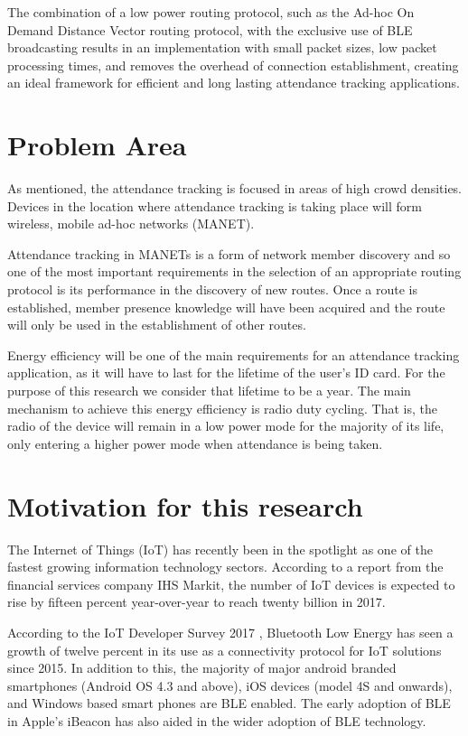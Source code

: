 	The combination of a low power routing protocol, such as the Ad-hoc On Demand
	Distance Vector routing protocol, with the exclusive use of BLE broadcasting results
	in an implementation with small packet sizes, low packet processing times, and
	removes the overhead of connection establishment, creating an ideal framework
	for efficient and long lasting attendance tracking applications.

	\section{Problem Area}
	As mentioned, the attendance tracking is focused in areas of high crowd densities.
	Devices in the location where attendance tracking is taking place will form wireless,
	mobile ad-hoc networks (MANET).

	Attendance tracking in MANETs is a form of network member discovery and so one of
	the most important requirements in the selection of an appropriate routing protocol
	is its performance in the discovery of new routes. Once a route is established,
	member presence knowledge will have been acquired and the route will only be used
	in the establishment of other routes.

	Energy efficiency will be one of the main requirements for an attendance tracking
	application, as it will have to last for the lifetime of the user's ID card. For
	the purpose of this research we consider that lifetime to be a year. The main
	mechanism to achieve this energy efficiency is radio duty cycling. That is, the
	radio of the device will remain in a low power mode for the majority of its life,
	only entering a higher power mode when attendance is being taken.

	\section{Motivation for this research}
	The Internet of Things (IoT) has recently been in the spotlight as one of the fastest
	growing information technology sectors. According to a report \cite{IHS_IOT} from
	the financial services company IHS Markit, the number of IoT devices is expected
	to rise by fifteen percent year-over-year to reach twenty billion in 2017.

	According to the IoT Developer Survey 2017 \cite{SURVEY_IOT}, Bluetooth Low Energy
	has seen a growth of twelve percent in its use as a connectivity protocol for IoT solutions
	since 2015. In addition to this, the majority of major android branded
	smartphones (Android OS 4.3 and above), iOS devices (model 4S and onwards),
	and Windows based smart phones are BLE enabled. The early adoption of BLE in Apple's
	iBeacon has also aided in the wider adoption of BLE technology.

